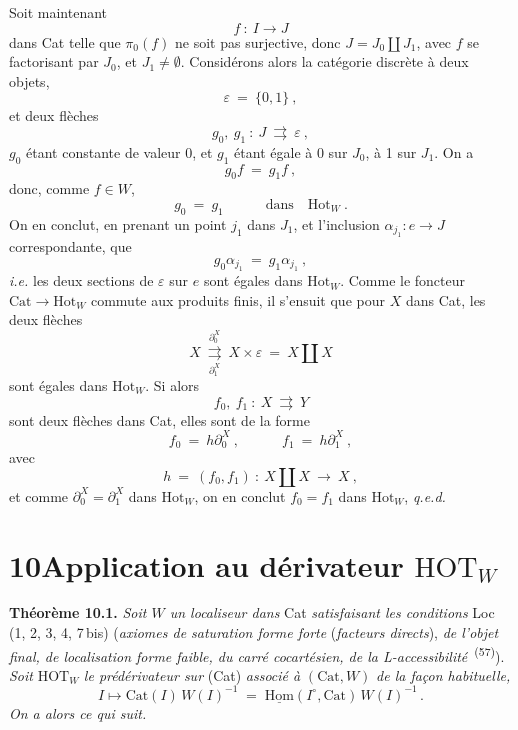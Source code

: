 \documentclass[11pt]{article}
\newcommand{\printedpage}[1]{\marginpar{\raggedright\footnotesize p.~#1}}
\newcommand{\msp}[1]{\marginpar{\raggedright\footnotesize [#1]}}
\newcommand{\Cat}{\mathrm{Cat}}
\newcommand{\Hot}{\mathrm{Hot}}
\newcommand{\HOT}{\mathrm{HOT}}
\begin{document}
Soit maintenant
\[
f\ :\ I\longrightarrow J
\]
dans Cat telle que $\pi_0(f)$ ne soit pas surjective, donc $J=J_0\amalg J_1$, avec $f$ se factorisant par $J_0$, et $J_1\neq\emptyset$. Considérons alors la catégorie discrète à deux objets,
\[
\varepsilon\ =\ \{0,1\}\ ,
\]
et deux flèches
\[
g_0,\ g_1\ :\ J\ \rightrightarrows\ \varepsilon\ ,
\]
$g_0$ étant constante de valeur 0, et $g_1$ étant égale à 0 sur $J_0$, à 1 sur $J_1$. On a
\[
g_0f\ =\ g_1f\ ,
\]
donc, comme $f\in W$,
\[
g_0\ =\ g_1\qquad\quad\text{dans}\quad\Hot_W\ .
\]
On en conclut, en prenant un point $j_1$ dans $J_1$, et l'inclusion $\alpha_{j_1}:e\longrightarrow J$ correspondante, que
\msp{page 133 quinquies}
\[
g_0\alpha_{j_1}\ =\ g_1\alpha_{j_1}\ ,
\]
\textit{i.e.} les deux sections de $\varepsilon$ sur $e$ sont égales dans $\Hot_W$. Comme le foncteur $\Cat\longrightarrow\Hot_W$ commute aux produits finis, il s'ensuit que pour $X$ dans Cat, les deux flèches
\[
X\ \underset{\partial_1^X}{\overset{\partial_0^X}{\rightrightarrows}}\ X\times\varepsilon\ =\ X\amalg X
\]
sont égales dans $\Hot_W$. Si alors
\[
f_0,\ f_1\ :\ X\ \rightrightarrows\ Y
\]
sont deux flèches dans Cat, elles sont de la forme
\[
f_0\ =\ h\partial_0^X\ ,\qquad\quad f_1\ =\ h\partial_1^X\ ,
\]
avec
\[
h\ =\ (f_0,f_1)\ :\ X\amalg X\ \longrightarrow\ X\ , %
\]
et comme $\partial_0^X=\partial_1^X$ dans $\Hot_W$, on en conclut $f_0=f_1$ dans $\Hot_W$, \quad \textit{q.e.d.}

\printedpage{74}

\msp{page 134}

\section*{10\quad Application au dérivateur $\HOT_W$}

\textbf{Théorème 10.1.} \textit{Soit $W$ un localiseur dans} Cat \textit{satisfaisant les conditions} Loc\,(1, 2, 3, 4, 7\,bis) (\textit{axiomes de saturation forme forte} (\textit{facteurs directs}), \textit{de l'objet final, de localisation forme faible, du carré cocartésien, de la L-accessibilité}~\textsuperscript{(57)}). \textit{Soit} $\HOT_W$ \textit{le prédérivateur sur} (Cat) \textit{associé à} $(\mathrm{Cat}, W)$ \textit{de la façon habituelle,}
\[
I \longmapsto \mathrm{Cat}(I)\,W(I)^{-1} \;=\; \underline{\mathrm{Hom}}(I^{\circ}, \mathrm{Cat})\,W(I)^{-1}\,. \tag*{(10.1.1)}
\]
\textit{On a alors ce qui suit.}
\end{document}
